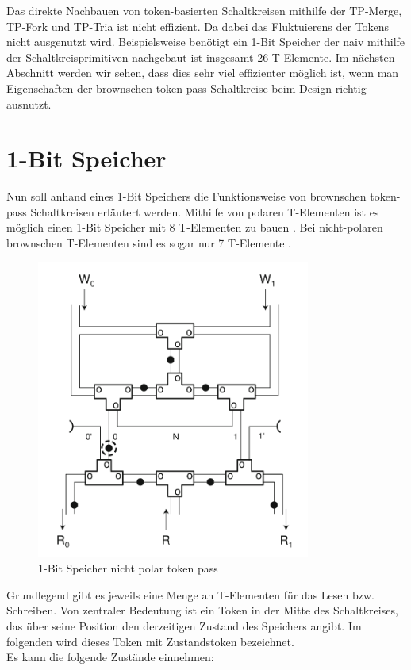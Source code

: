 \documentclass[11pt,a4paper]{article}
\begin{document}
%
Das direkte Nachbauen von token-basierten Schaltkreisen mithilfe
der TP-Merge, TP-Fork und TP-Tria ist nicht effizient.
%
Da dabei das Fluktuierens der Tokens nicht ausgenutzt wird.
%
Beispielsweise benötigt ein 1-Bit Speicher der naiv mithilfe der 
Schaltkreisprimitiven nachgebaut ist insgesamt 26 T-Elemente.
%
Im nächsten Abschnitt werden wir sehen, dass dies sehr viel effizienter möglich
ist, wenn man Eigenschaften der brownschen token-pass Schaltkreise
beim Design richtig ausnutzt.



\section{1-Bit Speicher}
Nun soll anhand eines 1-Bit Speichers die Funktionsweise von brownschen 
token-pass Schaltkreisen erläutert werden.
%
Mithilfe von polaren T-Elementen ist es möglich einen 1-Bit Speicher mit 8
T-Elementen zu bauen \cite{Peper_Fundamentals_2013}. 
%
Bei nicht-polaren brownschen T-Elementen sind es sogar
nur 7  T-Elemente \cite{Peper_nonPolar_2018}.

\begin{figure}[h]
      \centering
      \includegraphics[width=9cm]{bilder/NonPolarMemory.png} 
      \caption{1-Bit Speicher nicht polar token pass}
\end{figure}

Grundlegend gibt es jeweils eine Menge an T-Elementen für das Lesen bzw. 
Schreiben.
%
Von zentraler Bedeutung ist ein Token in der Mitte des Schaltkreises, das über seine Position den derzeitigen Zustand des Speichers angibt.
%
Im folgenden wird dieses Token mit Zustandstoken bezeichnet. \\
%
Es kann die folgende Zustände einnehmen:
\end{document}
